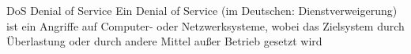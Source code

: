 
{DoS}%
{Denial of Service}%
{Ein Denial of Service (im Deutschen: Dienstverweigerung) ist ein Angriffe auf Computer- oder Netzwerksysteme, wobei das Zielsystem durch Überlastung oder durch andere Mittel außer Betrieb gesetzt wird}%